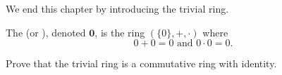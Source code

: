 We end this chapter by introducing the trivial ring.

\begin{definition}
    The  (or ), denoted $\textbf{0}$, is the ring $(\{0\}, +, \cdot)$ where
    \[
        0 + 0 = 0 \text{ and } 0 \cdot 0 = 0.
    \]
\end{definition}
\begin{exercise}
    Prove that the trivial ring is a commutative ring with identity.
\end{exercise}
